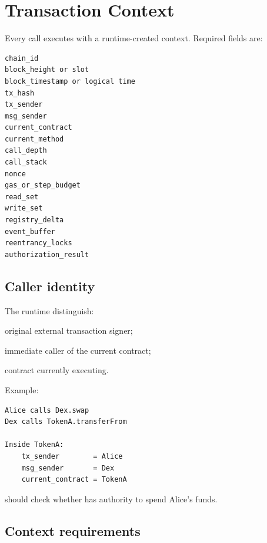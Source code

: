 \section{Transaction Context}

Every call executes with a runtime-created context. Required fields are:

\begin{lstlisting}
chain_id
block_height or slot
block_timestamp or logical time
tx_hash
tx_sender
msg_sender
current_contract
current_method
call_depth
call_stack
nonce
gas_or_step_budget
read_set
write_set
registry_delta
event_buffer
reentrancy_locks
authorization_result
\end{lstlisting}

\subsection{Caller identity}

The runtime \MUST{} distinguish:

\begin{description}[leftmargin=3.3cm]
  \item[\code{tx\_sender}] original external transaction signer;
  \item[\code{msg\_sender}] immediate caller of the current contract;
  \item[\code{current\_contract}] contract currently executing.
\end{description}

Example:

\begin{lstlisting}
Alice calls Dex.swap
Dex calls TokenA.transferFrom

Inside TokenA:
    tx_sender        = Alice
    msg_sender       = Dex
    current_contract = TokenA
\end{lstlisting}

 should check whether  has authority to spend Alice's funds.

\subsection{Context requirements}



